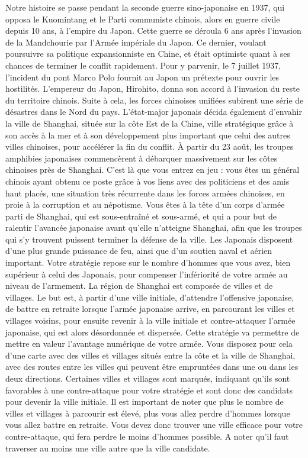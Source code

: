 
\newcommand{\maxa}{123456789}

Notre histoire se passe pendant la seconde guerre sino-japonaise en 1937, qui opposa le Kuomintang et le Parti communiste chinois, alors en guerre civile depuis 10 ans, à l’empire du Japon. Cette guerre se déroula 6 ans après l’invasion de la Mandchourie par l’Armée impériale du Japon. Ce dernier, voulant poursuivre sa politique expansionniste en Chine, et était optimiste quant à ses chances de terminer le conflit rapidement. Pour y parvenir, le 7 juillet 1937, l’incident du pont Marco Polo fournit au Japon un prétexte pour ouvrir les hostilités. L’empereur du Japon, Hirohito, donna son accord à l’invasion du reste du territoire chinois. Suite à cela, les forces chinoises unifiées subirent une série de désastres dans le Nord du pays. L’état-major japonais décida également d’envahir la ville de Shanghai, située sur la côte Est de la Chine, ville stratégique grâce à son accès à la mer et à son développement plus important que celui des autres villes chinoises, pour accélérer la fin du conflit. À partir du 23 août, les troupes amphibies japonaises commencèrent à débarquer massivement sur les côtes chinoises près de Shanghai. C’est là que vous entrez en jeu : vous êtes un général chinois ayant obtenu ce poste grâce à vos liens avec des politiciens et des amis haut placés, une situation très récurrente dans les forces armées chinoises, en proie à la corruption et au népotisme. Vous êtes à la tête d’un corps d’armée parti de Shanghai, qui est sous-entraîné et sous-armé, et qui a pour but de ralentir l’avancée japonaise avant qu’elle n’atteigne Shanghai, afin que les troupes qui s’y trouvent puissent terminer la défense de la ville. Les Japonais disposent d’une plus grande puissance de feu, ainsi que d’un soutien naval et aérien important. Votre stratégie repose sur le nombre d’hommes que vous avez, bien supérieur à celui des Japonais, pour compenser l’infériorité de votre armée au niveau de l’armement. La région de Shanghai est composée de villes et de villages. Le but est, à partir d’une ville initiale, d’attendre l’offensive japonaise, de battre en retraite lorsque l’armée japonaise arrive, en parcourant les villes et villages voisins, pour ensuite revenir à la ville initiale et contre-attaquer l’armée japonaise, qui est alors désordonnée et dispersée. Cette stratégie va permettre de mettre en valeur l’avantage numérique de votre armée. Vous disposez pour cela d’une carte avec des villes et villages situés entre la côte et la ville de Shanghai, avec des routes entre les villes qui peuvent être empruntées dans une ou dans les deux directions. Certaines villes et villages sont marqués, indiquant qu’ils sont favorables à une contre-attaque pour votre stratégie et sont donc des candidats pour devenir la ville initiale. Il est important de noter que plus le nombre de villes et villages à parcourir est élevé, plus vous allez perdre d’hommes lorsque vous allez battre en retraite. Vous devez donc trouver une ville efficace pour votre contre-attaque, qui fera perdre le moins d’hommes possible. A noter qu'il faut traverser au moins une ville autre que la ville candidate.

